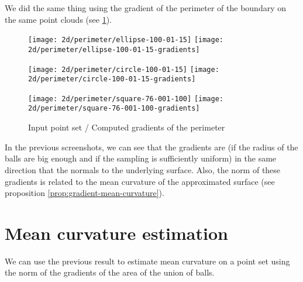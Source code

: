 We did the same thing using the gradient of the perimeter of the boundary on the
same point clouds (see \ref{fig:gradients_perimeter_2d}).

\begin{figure}[h]
    \centering

    \begin{minipage}{0.8\linewidth}
        \centering
        \texttt{[image: 2d/perimeter/ellipse-100-01-15]}
        \texttt{[image: 2d/perimeter/ellipse-100-01-15-gradients]}
        \label{fig:gradients_perimeter_2d_ellipse}
    \end{minipage}

    \begin{minipage}{0.8\linewidth}
        \centering
        \texttt{[image: 2d/perimeter/circle-100-01-15]}
        \texttt{[image: 2d/perimeter/circle-100-01-15-gradients]}
        \label{fig:gradients_perimeter_2d_circle}
    \end{minipage}

    \begin{minipage}{0.8\linewidth}
        \centering
        \texttt{[image: 2d/perimeter/square-76-001-100]}
        \texttt{[image: 2d/perimeter/square-76-001-100-gradients]}
        \label{fig:gradients_perimeter_2d_square}
    \end{minipage}

    \caption{Input point set / Computed gradients of the perimeter}
    \label{fig:gradients_perimeter_2d}
\end{figure}

In the previous screenshots, we can see that the gradients are (if the radius of
the balls are big enough and if the sampling is sufficiently uniform) in the
same direction that the normals to the underlying surface. Also, the norm of
these gradients is related to the mean curvature of the approximated surface
(see proposition \ref{prop:gradient-mean-curvature}).

\section{Mean curvature estimation}

We can use the previous result to estimate mean curvature on a point set using
the norm of the gradients of the area of the union of balls.

